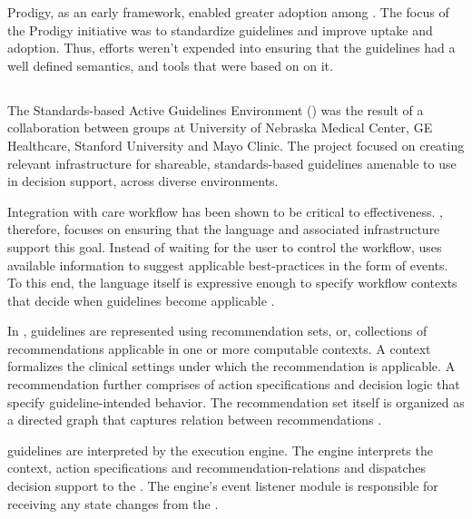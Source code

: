 Prodigy, as an early \CDSS{} framework, enabled greater adoption among
\HCPs{}. The focus of the Prodigy initiative was to standardize guidelines and
improve uptake and adoption. Thus, efforts weren't expended into ensuring that
the guidelines had a well defined semantics, and tools that were based on
on it.

\subsection{\SAGE{}}\label{sec:sage}

The Standards-based Active Guidelines Environment (\SAGE{}) was the
result of a collaboration between groups at University of Nebraska
Medical Center, GE Healthcare, Stanford University and Mayo Clinic.
The project focused on creating relevant infrastructure for shareable,
standards-based guidelines amenable to use in decision support, across
diverse \EHR{} environments.

Integration with care workflow has been shown to be critical to \CDSS{}
effectiveness. \SAGE{}, therefore, focuses on ensuring that the language
and associated infrastructure support this goal. Instead of waiting for
the user to control the workflow, \SAGE{} uses available information to
suggest applicable best-practices in the form of events. To this end,
the language itself is expressive enough to specify workflow contexts
that decide when guidelines become applicable \cite{TuAMIA07}.

In \SAGE{}, guidelines are represented using recommendation sets, or,
collections of recommendations applicable in one or more computable
contexts. A context formalizes the clinical settings under which
the recommendation is applicable. A recommendation further comprises
of action specifications and decision logic that specify guideline-intended
\HCP{} behavior. The recommendation set itself is organized as a directed
graph that captures relation between recommendations \cite{TuAMIA07}.

\SAGE{} guidelines are interpreted by the \SAGE{} execution engine.
The engine interprets the context, action specifications
and recommendation-relations and dispatches decision support
to the \EHR{}. The engine's event listener module is responsible
for receiving any state changes from the \EHR{} \cite{RamMEDINFO04}.

